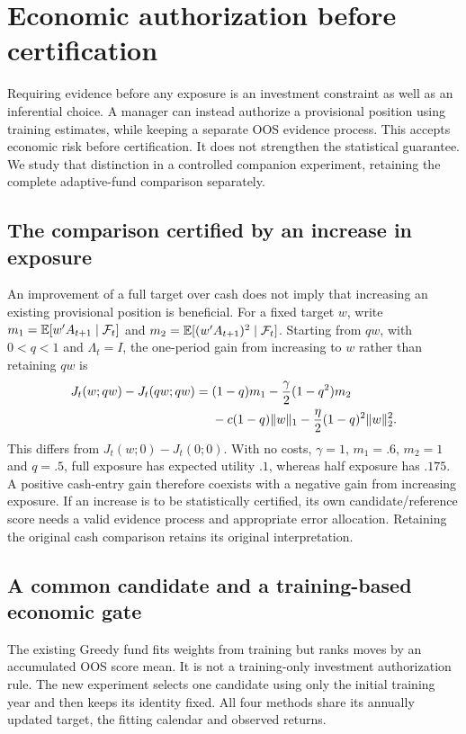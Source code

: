 \section{Economic authorization before certification}
\label{sec:economic-authorization}
Requiring evidence before any exposure is an investment constraint as well as
an inferential choice. A manager can instead authorize a provisional position
using training estimates, while keeping a separate OOS evidence process.
This accepts economic risk before certification. It does not strengthen the
statistical guarantee. We study that distinction in a controlled companion
experiment, retaining the complete adaptive-fund comparison separately.

\subsection{The comparison certified by an increase in exposure}
An improvement of a full target over cash does not imply that increasing an
existing provisional position is beneficial. For a fixed target $w$, write
$m_1=\mathbb E[w'A_{t+1}\mid\mathcal F_t]$ and
$m_2=\mathbb E[(w'A_{t+1})^2\mid\mathcal F_t]$. Starting from $qw$, with $0<q<1$ and
$\Lambda_t=I$, the one-period gain from increasing to $w$ rather than
retaining $qw$ is
\begin{align}
 J_t(w;qw)-J_t(qw;qw)
 ={}&(1-q)m_1-\frac{\gamma}{2}(1-q^2)m_2\notag\\
 &-c(1-q)\|w\|_1-\frac{\eta}{2}(1-q)^2\|w\|_2^2.
 \label{eq:authorization-increase}
\end{align}
This differs from $J_t(w;0)-J_t(0;0)$. With no costs, $\gamma=1$,
$m_1=.6$, $m_2=1$ and $q=.5$, full exposure has expected utility $.1$,
whereas half exposure has $.175$. A positive cash-entry gain therefore
coexists with a negative gain from increasing exposure.
If an increase is to be statistically certified, its own candidate/reference
score needs a valid evidence process and appropriate error allocation.
Retaining the original cash comparison retains its original interpretation.

\subsection{A common candidate and a training-based economic gate}
The existing Greedy fund fits weights from training but ranks moves by an
accumulated OOS score mean. It is not a training-only investment authorization
rule. The new experiment selects one candidate using only the initial training
year and then keeps its identity fixed. All four methods share its annually
updated target, the fitting calendar and observed returns.

